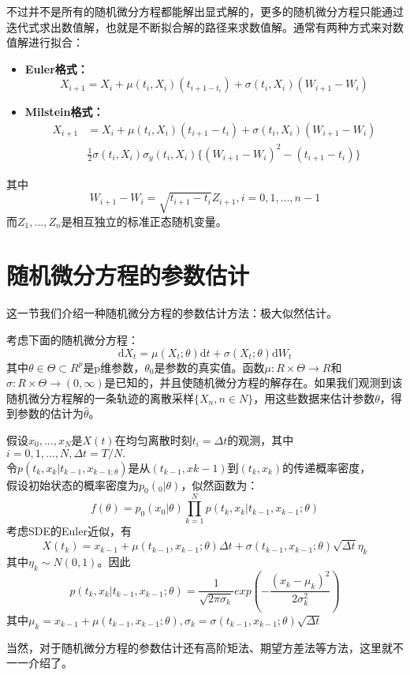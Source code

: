 \documentclass{article}
\begin{document}
不过并不是所有的随机微分方程都能解出显式解的，更多的随机微分方程只能通过迭代式求出数值解，也就是不断拟合解的路径来求数值解。通常有两种方式来对数值解进行拟合：

\begin{itemize}
	\item \textbf{Euler格式：} $$X_{i+1} = X_i + \mu (t_i,X_i)(t_{i+1-t_i}) + \sigma(t_i,X_i)(W_{i+1}-W_i)$$
	\item \textbf{Milstein格式：}	
	\begin{align}
	X_{i+1} &= X_i + \mu (t_i,X_i)(t_{i+1}-t_i)+\sigma (t_i,X_i)(W_{i+1}-W_i)\\
			&\frac{1}{2}\sigma(t_i,X_i)\sigma_y(t_i,X_i)\{(W_{i+1}-W_i)^2-(t_{i+1}-t_i)\}
	\end{align}
\end{itemize}
其中$$W_{i+1}-W_i = \sqrt{t_{i+1}-t_i}Z_{i+1}, i=0,1,...,n-1$$
	而$Z_1,...,Z_n$是相互独立的标准正态随机变量。



\section{随机微分方程的参数估计}
这一节我们介绍一种随机微分方程的参数估计方法：极大似然估计。

考虑下面的随机微分方程：$$\mathrm{d}X_t = \mu(X_t;\theta)\mathrm{d}t + \sigma(X_t;\theta)\mathrm{d}W_t$$
其中$\theta \in \Theta \subset R^p$是p维参数，$\theta_0$是参数的真实值。函数$\mu:R\times\Theta \rightarrow R$和$\sigma:R\times\Theta \rightarrow (0, \infty)$是已知的，并且使随机微分方程的解存在。如果我们观测到该随机微分方程解的一条轨迹的离散采样$\{X_n, n\in N\}$，用这些数据来估计参数$\theta$，得到参数的估计为$\hat{\theta}$。

假设$x_0,...,x_N$是$X(t)$在均匀离散时刻$t_i = \Delta t$的观测，其中$i = 0,1,...,N, \Delta t = T/N.$\\
令$p(t_k,x_k|t_{k-1},x_{k-1;\theta})$是从$(t_{k-1},x{k-1})$到$(t_k,x_k)$的传递概率密度，\\
假设初始状态的概率密度为$p_0(_0|\theta)$，似然函数为：$$f(\theta) = p_0(x_0|\theta)\prod_{k=1}^Np(t_k,x_k|t_{k-1},x_{k-1};\theta)$$
考虑SDE的Euler近似，有$$X(t_k) = x_{k-1} + \mu (t_{k-1},x_{k-1};\theta)\Delta t + \sigma(t_{k-1},x_{k-1};\theta)\sqrt{\Delta t}\eta_k$$
其中$\eta_k \sim N(0,1)$。因此
$$p(t_k,x_k|t_{k-1},x_{k-1};\theta) = \frac{1}{\sqrt{2\pi\sigma_k}}exp(-\frac{(x_k-\mu_k)^2}{2\sigma_k^2})$$
其中$\mu_k = x_{k-1} + \mu(t_{k-1},x_{k-1};\theta), \sigma_k = \sigma(t_{k-1},x_{k-1};\theta)\sqrt{\Delta t}$

当然，对于随机微分方程的参数估计还有高阶矩法、期望方差法等方法，这里就不一一介绍了。
\end{document}
